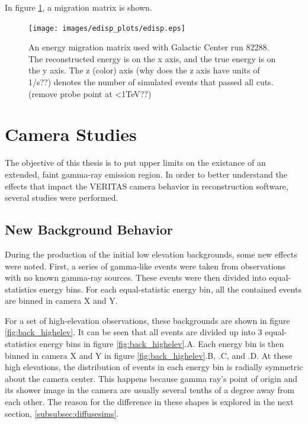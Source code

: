 In figure \ref{fig:migmatrix}, a migration matrix is shown.

\begin{figure}[ht]
  \begin{center}
    \texttt{[image: images/edisp\_plots/edisp.eps]}
    \caption[Energy Migration Matrix]{An energy migration matrix used with Galactic Center run 82288.  The reconstructed energy is on the x axis, and the true energy is on the y axis.  The z (color) axis (why does the z axis have units of 1/s??) denotes the number of simulated events that passed all cuts. (remove probe point at <1TeV??)}\label{fig:migmatrix}
  \end{center}
\end{figure}

\section{Camera Studies}
The objective of this thesis is to put upper limits on the existance of an extended, faint gamma-ray emission region.
In order to better understand the effects that impact the VERITAS camera behavior in reconstruction software, several studies were performed.

\subsection{New Background Behavior}

During the production of the initial low elevation backgrounds, some new effects were noted.
First, a series of gamma-like events were taken from observations with no known gamma-ray sources.
These events were then divided into equal-statistics energy bins.
For each equal-statistic energy bin, all the contained events are binned in camera X and Y.

For a set of high-elevation observations, these backgrounds are shown in figure \ref{fig:back_highelev}.
It can be seen that all events are divided up into 3 equal-statistics energy bins in figure \ref{fig:back_highelev}.A.
Each energy bin is then binned in camera X and Y in figure \ref{fig:back_highelev}.B, .C, and .D.
At these high elevations, the distribution of events in each energy bin is radially symmetric about the camera center.
This happens because gamma ray's point of origin and its shower image in the camera are usually several tenths of a degree away from each other.
The reason for the difference in these shapes is explored in the next section, \ref{subsubsec:diffusesims}.

